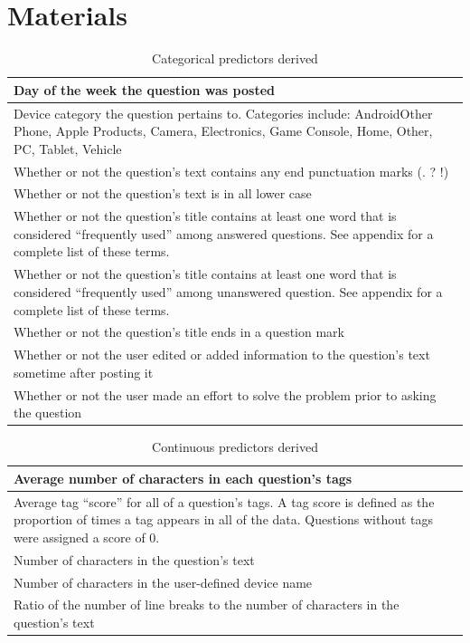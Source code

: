 \documentclass{article}
\begin{document}

\section*{Materials}

\begin{table}[!htbp]
\centering
\begin{tabular}{|p{10cm}|}
  \hline
  Day of the week the question was posted \\ \hline
  Device category the question pertains to. Categories include: Android\/Other Phone, Apple Products, Camera, Electronics, Game Console, Home, Other, PC, Tablet, Vehicle \\ \hline
  Whether or not the question's text contains any end punctuation marks (. ? !) \\ \hline
  Whether or not the question's text is in all lower case \\ \hline
  Whether or not the question's title contains at least one word that is considered ``frequently used'' among answered questions. See appendix for a complete list of these terms. \\ \hline
  Whether or not the question's title contains at least one word that is considered ``frequently used'' among unanswered question. See appendix for a complete list of these terms. \\ \hline
  Whether or not the question's title ends in a question mark \\ \hline
  Whether or not the user edited or added information to the question's text sometime after posting it \\ \hline
  Whether or not the user made an effort to solve the problem prior to asking the question \\ \hline
\end{tabular}
\caption{Categorical predictors derived}
\label{table:categorical}
\end{table}

\begin{table}[!htbp]
\centering
\begin{tabular}{|p{10cm}|}
  \hline
  Average number of characters in each question's tags\\ \hline
  Average tag ``score'' for all of a question's tags. A tag score is defined as the proportion of times a tag appears in all of the data. Questions without tags were assigned a score of 0. \\ \hline
  Number of characters in the question's text \\ \hline
  Number of characters in the user-defined device name \\ \hline
  Ratio of the number of line breaks to the number of characters in the question's text \\ \hline
\end{tabular}
\caption{Continuous predictors derived}
\label{table:continuous}
\end{table}
\end{document}
